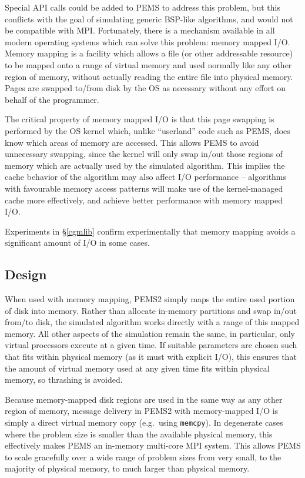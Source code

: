 \documentclass[12pt]{carletoncsthesis}
\begin{document}
Special API calls could be added to PEMS to address this problem, but
this conflicts with the goal of simulating generic BSP-like algorithms,
and would not be compatible with MPI.  Fortunately, there is a mechanism
available in all modern operating systems which can solve this problem:
memory mapped I/O.  Memory mapping is a facility which allows a file (or
other addressable resource) to be mapped onto a range of virtual memory and
used normally like any other region of memory, without actually reading the
entire file into physical memory.  Pages are swapped to/from disk by the OS
as necessary without any effort on behalf of the programmer.

The critical property of memory mapped I/O is that this page swapping is
performed by the OS kernel which, unlike ``userland'' code such as PEMS,
does know which areas of memory are accessed.  This allows PEMS to avoid
unnecessary swapping, since the kernel will only swap in/out those regions
of memory which are actually used by the simulated algorithm.  This implies
the cache behavior of the algorithm may also affect I/O performance --
algorithms with favourable memory access patterns will make use of the
kernel-managed cache more effectively, and achieve better performance
with memory mapped I/O.

Experiments in \S\ref{cgmlib} confirm experimentally that memory mapping
avoids a significant amount of I/O in some cases.

\subsection{Design}


When used with memory mapping, PEMS2 simply maps the entire used portion
of disk into memory.  Rather than allocate in-memory partitions and swap
in/out from/to disk, the simulated algorithm works directly with a range
of this mapped memory.  All other aspects of the simulation remain the
same, in particular, only  virtual processors execute at a given time.
If suitable parameters are chosen such that  fits within physical memory
(as it must with explicit I/O), this ensures that the amount of virtual memory
used at any given time fits within physical memory, so thrashing is avoided.

Because memory-mapped disk regions are used in the same way as any other
region of memory, message delivery in PEMS2 with memory-mapped I/O is simply
a direct virtual memory copy (e.g.\ using {\tt memcpy}).  In degenerate cases
where the problem size is smaller than the available physical memory, this
effectively makes PEMS an in-memory multi-core MPI system.  This allows PEMS
to scale gracefully over a wide range of problem sizes from very small,
to the majority of physical memory, to much larger than physical memory.
\end{document}
